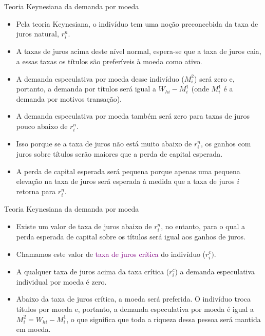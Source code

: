 \documentclass[10pt]{beamer}
\begin{document}
\begin{frame}{Teoria Keynesiana da demanda por moeda}
\begin{itemize}
    \item Pela teoria Keynesiana, o indivíduo tem uma noção preconcebida da taxa de juros natural, $r_i^n$.
    \bigskip
    \item A taxas de juros acima deste nível normal, espera-se que a taxa de juros caia, a essas taxas os títulos são preferíveis à moeda como ativo.
    \bigskip
    \item A demanda especulativa por moeda desse indivíduo ($M_i^2$) será zero e, portanto, a demanda por títulos será igual a $W_{hi} - M_i^1$ (onde $M_i^1$ é a demanda por motivos transação).
    \bigskip
    \item A demanda especulativa por moeda também será zero para taxas de juros pouco abaixo de $r_i^n$.
    \bigskip
    \item Isso porque se a taxa de juros não está muito abaixo de $r_i^n$, os ganhos com juros sobre títulos serão maiores que a perda de capital esperada.
    \bigskip
    \item A perda de capital esperada será pequena porque apenas uma pequena elevação na taxa de juros será esperada à medida que a taxa de juros $i$ retorna para $r_i^n$.
\end{itemize}
\end{frame}

\begin{frame}{Teoria Keynesiana da demanda por moeda}
\begin{itemize}
    \item Existe um valor de taxa de juros abaixo de $r_i^n$, no entanto, para o qual a perda esperada de capital sobre os títulos será igual aos ganhos de juros.
    \bigskip
    \item Chamamos este valor de \textcolor{purple}{taxa de juros crítica} do indivíduo ($r_i^c)$.
    \bigskip
    \item A qualquer taxa de juros acima da taxa crítica ($r_i^c$) a demanda especulativa individual por moeda é zero.
    \bigskip
    \item Abaixo da taxa de juros crítica, a moeda será preferida. O indivíduo troca títulos por moeda e, portanto, a demanda especulativa por moeda é igual a $M_{i}^{2} = W_{hi} - M_{i}^1$, o que significa que toda a riqueza dessa pessoa será mantida em moeda.
\end{itemize}
\end{frame}
\end{document}
